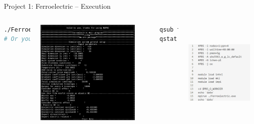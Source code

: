 \documentclass[11pt,aspectratio=169]{beamer}
\begin{document}
\begin{frame}[fragile]{Project 1: Ferroelectric -- Execution}
\begin{columns}
\centering
\begin{lstlisting}[language=bash]
./Ferroelectric.exe # Run directly
# Or you may submit a job
\end{lstlisting}
\includegraphics[height=0.85\textwidth]{img/ferro_run.png}
\centering
\begin{lstlisting}[language=bash]
qsub ferro.pbs
qstat -u [your username]
\end{lstlisting}
\includegraphics[height=0.85\textwidth]{img/ferro_pbs.png}
\end{columns}
\end{frame}
\end{document}
